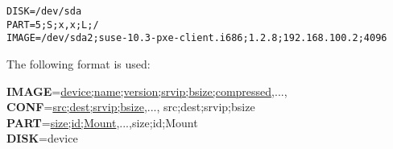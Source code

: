 \begin{verbatim}
DISK=/dev/sda
PART=5;S;x,x;L;/
IMAGE=/dev/sda2;suse-10.3-pxe-client.i686;1.2.8;192.168.100.2;4096
\end{verbatim}

The following format is used:

\begin{Command}{14cm}
    \textbf{IMAGE}=\underline{device;name;version;srvip;bsize;compressed},...,\\
    \textbf{CONF}=\underline{src;dest;srvip;bsize},...,
                             src;dest;srvip;bsize\\
    \textbf{PART}=\underline{size;id;Mount},...,size;id;Mount\\
    \textbf{DISK}=device
\end{Command}

